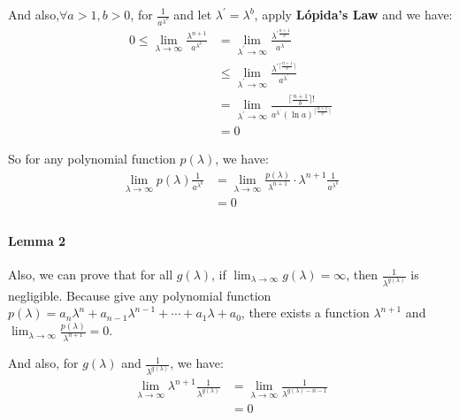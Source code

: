 \documentclass[a4paper,12pt]{article}
\begin{document}
And also,$\forall a > 1, b > 0$, for $\frac{1}{a^{\lambda^b}}$ and let $\lambda^{'} = \lambda^b$, apply \textbf{Lópida's Law} and we have:
\begin{equation}
    \begin{aligned}
        0 \leq \lim_{\lambda \to \infty}\frac{\lambda^{n + 1}}{a^{\lambda^b}} & = \lim_{\lambda^{'} \to \infty} \frac{ \lambda^{'\frac{n+1}{b}}}{ a^{\lambda^{'}}}                                    \\
                                                                              & \leq \lim_{\lambda^{'} \to \infty} \frac{ \lambda^{'\lceil\frac{n+1}{b}\rceil}}{ a^{\lambda^{'}}}                     \\
                                                                              & = \lim_{\lambda^{'} \to \infty} \frac{\lceil\frac{n+1}{b}\rceil!}{a^{\lambda^{'}}(\ln a)^{\lceil\frac{n+1}{b}\rceil}} \\
                                                                              & = 0
    \end{aligned}
\end{equation}

So for any polynomial function $p(\lambda)$, we have:
\begin{equation}
    \begin{aligned}
        \lim_{\lambda \to \infty}p(\lambda)\frac{1}{a^{\lambda^b}} & = \lim_{\lambda \to \infty}\frac{p(\lambda)}{\lambda^{n + 1}}\cdot \lambda^{n + 1}\frac{1}{a^{\lambda^b}} \\
                                                                   & = 0                                                                                                       \\
    \end{aligned}
\end{equation}

\paragraph*{Lemma 2}
Also, we can prove that for all $g(\lambda)$, if $\lim_{\lambda \to \infty}g(\lambda) = \infty$, then $\frac{1}{\lambda^{g(\lambda)}}$ is negligible. Because give any polynomial function $p(\lambda) = a_n\lambda^n + a_{n - 1}\lambda^{n - 1} + \cdots + a_1\lambda + a_0$, there exists a function $\lambda^{n + 1}$ and $\lim_{\lambda \to \infty}\frac{p(\lambda)}{\lambda^{n + 1}} = 0$.

And also, for $g(\lambda)$ and $\frac{1}{\lambda^{g(\lambda)}}$, we have:
\begin{equation}
    \begin{aligned}
        \lim_{\lambda \to \infty}\lambda^{n + 1}\frac{1}{\lambda^{g(\lambda)}} & =\lim_{\lambda \to \infty}\frac{1}{\lambda^{g(\lambda) - n - 1}} \\
                                                                               & = 0                                                              \\
    \end{aligned}
\end{equation}
\end{document}
